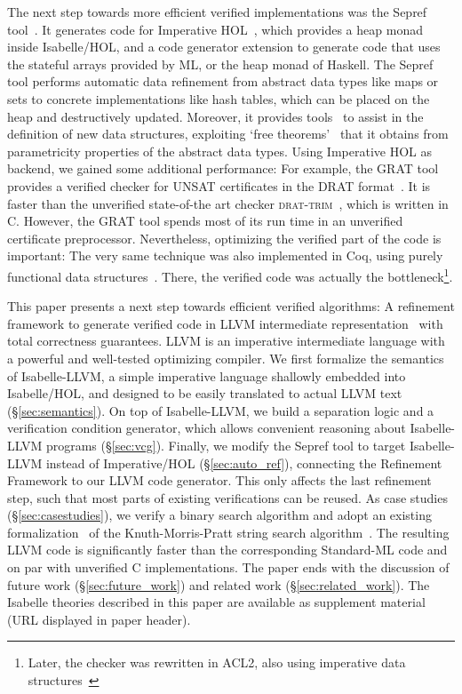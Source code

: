 \documentclass[a4paper,USenglish,cleveref, autoref]{lipics-v2019}
\begin{document}
The next step towards more efficient verified implementations was the Sepref tool~\cite{La15}. 
It generates code for Imperative HOL~\cite{BKHEM08}, which provides a heap monad inside Isabelle/HOL, 
and a code generator extension to generate code that uses the stateful arrays provided by ML, or the heap monad of Haskell.
The Sepref tool performs automatic data refinement from abstract data types like maps or sets to concrete implementations like hash tables, which 
can be placed on the heap and destructively updated. 
Moreover, it provides tools~\cite{La16} to assist in the definition of new data structures, exploiting `free theorems'~\cite{Wad89} that it 
obtains from parametricity properties of the abstract data types.
%
Using Imperative HOL as backend, we gained some additional performance: For example, the GRAT tool~\cite{La17_CADE,La17_SAT} provides a 
verified checker for UNSAT certificates in the DRAT format~\cite{WHH14}. It is faster than the unverified state-of-the art 
checker \textsc{drat-trim}~\cite{WHH14}, which is written in C. However, the GRAT tool spends most of its run time in an unverified 
certificate preprocessor. Nevertheless, optimizing the verified part of the code is important: The very same technique was also implemented in Coq,
using purely functional data structures~\cite{CMS17,CHHKS17}. There, the verified code was actually the 
bottleneck\footnote{Later, the checker was rewritten in ACL2, also using imperative data structures~\cite{CHHKS17,HHKW17}}.

This paper presents a next step towards efficient verified algorithms: A refinement framework to generate verified code in LLVM intermediate representation~\cite{LLVM-manual} 
with total correctness guarantees. LLVM is an imperative intermediate language with a powerful and well-tested optimizing compiler.
We first formalize the semantics of Isabelle-LLVM, a simple imperative language shallowly embedded into Isabelle/HOL, 
and designed to be easily translated to actual LLVM text (\S\ref{sec:semantics}). 
On top of Isabelle-LLVM, we build a separation logic and a verification condition generator, which allows convenient reasoning about Isabelle-LLVM programs (\S\ref{sec:vcg}).
Finally, we modify the Sepref tool to target Isabelle-LLVM instead of Imperative/HOL (\S\ref{sec:auto_ref}), connecting 
the Refinement Framework to our LLVM code generator. This only affects the last refinement step, 
such that most parts of existing verifications can be reused. 
As case studies (\S\ref{sec:casestudies}), we verify a binary search algorithm and adopt an existing formalization~\cite{HeLa17} of
the Knuth-Morris-Pratt string search algorithm~\cite{KMP77}. The resulting LLVM code is significantly
faster than the corresponding Standard-ML code and on par with unverified C implementations.
The paper ends with the discussion of future work (\S\ref{sec:future_work}) and related work (\S\ref{sec:related_work}).
%
The Isabelle theories described in this paper are available as supplement material (URL displayed in paper header).
\end{document}
